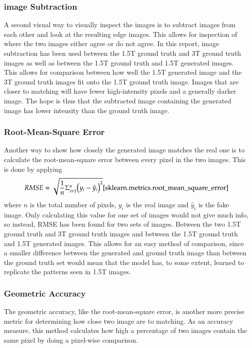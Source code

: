 \documentclass[11pt, fleqn, titlepage]{article}
\newcommand{\1}[1]{\mathds{1}\left[#1\right]}
\begin{document}
\subsubsection{image Subtraction}\label{image_subtraction}
A second visual way to visually inspect the images is to subtract images from each other and look at the resulting edge images. This allows for inspection of where the two images either agree or do not agree. In this report, image subtraction has been used between the 1.5T ground truth and 3T ground truth images as well as between the 1.5T ground truth and 1.5T generated images. This allows for comparison between how well the 1.5T generated image and the 3T ground truth images fit onto the 1.5T ground truth image. Images that are closer to matching will have fewer high-intensity pixels and a generally darker image. The hope is thus that the subtracted image containing the generated image has lower intensity than the ground truth image.

\subsubsection{Root-Mean-Square Error}\label{rmse}
Another way to show how closely the generated image matches the real one is to calculate the root-mean-square error between every pixel in the two images. This is done by applying
\begin{equation}
	RMSE = \sqrt{\frac{1}{n}\Sigma_{i=1}^{n}{\Big(y_i - \hat{y}_i\Big)^2}}\cite{sklearn.metrics.root_mean_square_error}
\end{equation}
where $n$ is the total number of pixels, $y_i$ is the real image and $\hat{y}_i$ is the fake image. Only calculating this value for one set of images would not give much info, so instead, RMSE has been found for two sets of images. Between the two 1.5T ground truth and 3T ground truth images and between the 1.5T ground truth and 1.5T generated images. This allows for an easy method of comparison, since a smaller difference between the generated and ground truth image than between the ground truth set would mean that the model has, to some extent, learned to replicate the patterns seen in 1.5T images.

\subsubsection{Geometric Accuracy}\label{geometric_accuracy}
The geometric accuracy, like the root-mean-square error, is another more precise metric for determining how close two image are to matching. As an accuracy measure, this method calculates how high a percentage of two images contain the same pixel by doing a pixel-wise comparison.
\end{document}
